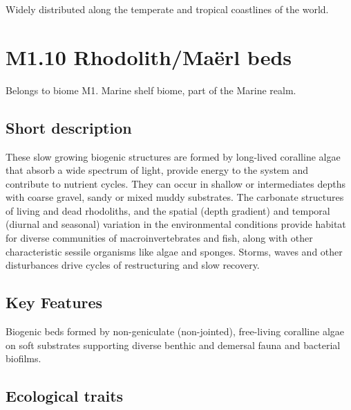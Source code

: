 \documentclass[
  letterpaper,
  DIV=11,
  numbers=noendperiod]{scrartcl}
\begin{document}
Widely distributed along the temperate and tropical coastlines of the
world.

\section{M1.10 Rhodolith/Maërl beds}\label{m1.10-rhodolithmauxebrl-beds}

Belongs to biome M1. Marine shelf biome, part of the Marine realm.

\subsection{Short description}\label{short-description-26}

These slow growing biogenic structures are formed by long-lived
coralline algae that absorb a wide spectrum of light, provide energy to
the system and contribute to nutrient cycles. They can occur in shallow
or intermediates depths with coarse gravel, sandy or mixed muddy
substrates. The carbonate structures of living and dead rhodoliths, and
the spatial (depth gradient) and temporal (diurnal and seasonal)
variation in the environmental conditions provide habitat for diverse
communities of macroinvertebrates and fish, along with other
characteristic sessile organisms like algae and sponges. Storms, waves
and other disturbances drive cycles of restructuring and slow recovery.

\subsection{Key Features}\label{key-features-26}

Biogenic beds formed by non-geniculate (non-jointed), free-living
coralline algae on soft substrates supporting diverse benthic and
demersal fauna and bacterial biofilms.

\subsection{Ecological traits}\label{ecological-traits-26}
\end{document}
